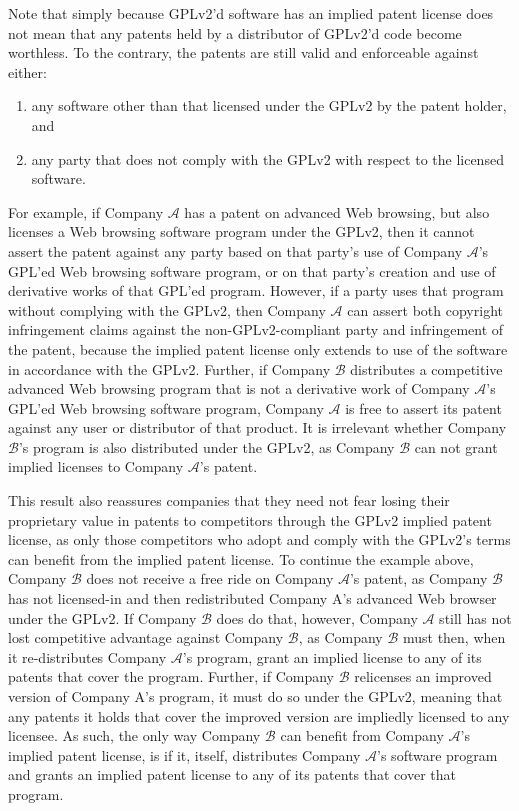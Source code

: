 Note that simply because GPLv2'd software has an implied patent license does
not mean that any patents held by a distributor of GPLv2'd code become
worthless. To the contrary, the patents are still valid and enforceable
against either:

\begin{enumerate}
 \renewcommand{\theenumi}{\alph{enumi}}
 \renewcommand{\labelenumi}{\textup{(\theenumi)}}

\item any software other than that licensed under the GPLv2 by the patent
  holder, and

\item any party that does not comply with the GPLv2
with respect to the licensed software.
\end{enumerate}

\newcommand{\compB}{$\mathcal{B}$}
\newcommand{\compA}{$\mathcal{A}$}

For example, if Company \compA{} has a patent on advanced Web browsing, but
also licenses a Web browsing software program under the GPLv2, then it
cannot assert the patent against any party based on that party's use of 
Company \compA{}'s GPL'ed Web browsing software program, or on that party's
creation and use of derivative works of that GPL'ed program.  However, if a
party uses that program without
complying with the GPLv2, then Company \compA{} can assert both copyright
infringement claims against the non-GPLv2-compliant party and
infringement of the patent, because the implied patent license only
extends to use of the software in accordance with the GPLv2. Further, if
Company \compB{} distributes a competitive advanced Web browsing program 
that is not a derivative work of Company \compA{}'s GPL'ed Web browsing software
program, Company \compA{} is free to assert its patent against any user or
distributor of that product. It is irrelevant whether Company \compB's
program is also distributed under the GPLv2, as Company \compB{} can not grant
implied licenses to Company \compA's patent.

This result also reassures companies that they need not fear losing their
proprietary value in patents to competitors through the GPLv2 implied patent
license, as only those competitors who adopt and comply with the GPLv2's
terms can benefit from the implied patent license. To continue the
example above, Company \compB{} does not receive a free ride on Company
\compA's patent, as Company \compB{} has not licensed-in and then
redistributed Company A's advanced Web browser under the GPLv2. If Company
\compB{} does do that, however, Company \compA{} still has not lost
competitive advantage against Company \compB{}, as Company \compB{} must then,
when it re-distributes Company \compA's program, grant an implied license
to any of its patents that cover the program. Further, if Company \compB{}
relicenses an improved version of Company A's program, it must do so under
the GPLv2, meaning that any patents it holds that cover the improved version
are impliedly licensed to any licensee. As such, the only way Company
\compB{} can benefit from Company \compA's implied patent license, is if it,
itself, distributes Company \compA's software program and grants an
implied patent license to any of its patents that cover that program.

